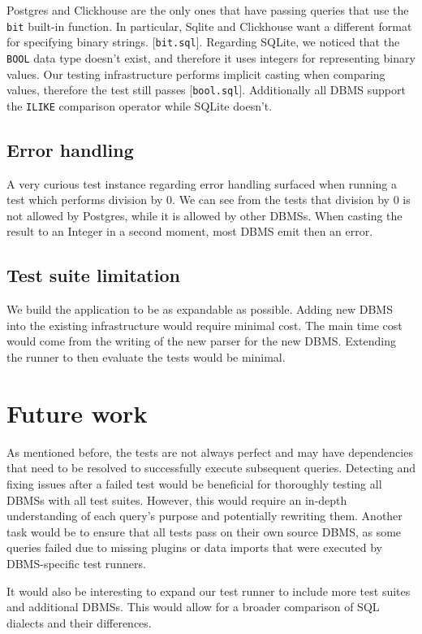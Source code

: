 \documentclass[acmsmall,nonacm]{acmart}
\begin{document}
Postgres and Clickhouse are the only ones that have passing queries that use the \texttt{bit} built-in function. In particular, Sqlite and Clickhouse want a different format for specifying binary strings. [\texttt{bit.sql}]. Regarding SQLite, we noticed that the \texttt{BOOL} data type doesn't exist, and therefore it uses integers for representing binary values. Our testing infrastructure performs implicit casting when comparing values, therefore the test still passes [\texttt{bool.sql}]. Additionally all DBMS support the \texttt{ILIKE} comparison operator while SQLite doesn't.


\subsection{Error handling}
A very curious test instance regarding error handling surfaced when running a test which performs division by 0. We can see from the tests that division by 0 is not allowed by Postgres, while it is allowed by other DBMSs. When casting the result to an Integer in a second moment, most DBMS emit then an error.


\subsection{Test suite limitation}

We build the application to be as expandable as possible. Adding new DBMS into the existing infrastructure would require minimal cost. The main time cost would come from the writing of the new parser for the new DBMS. Extending the runner to then evaluate the tests would be minimal.

\section{Future work}
As mentioned before, the tests are not always perfect and may have dependencies that need to be resolved to successfully execute subsequent queries. Detecting and fixing issues after a failed test would be beneficial for thoroughly testing all DBMSs with all test suites. However, this would require an in-depth understanding of each query's purpose and potentially rewriting them. Another task would be to ensure that all tests pass on their own source DBMS, as some queries failed due to missing plugins or data imports that were executed by DBMS-specific test runners.

It would also be interesting to expand our test runner to include more test suites and additional DBMSs. This would allow for a broader comparison of SQL dialects and their differences.
\end{document}
